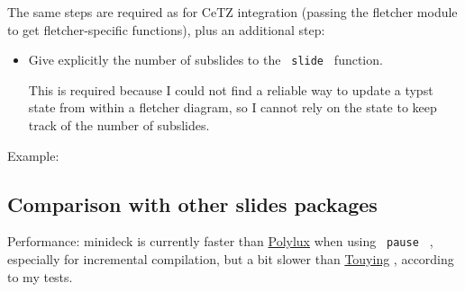 The same steps are required as for CeTZ integration (passing the
fletcher module to get fletcher-specific functions), plus an additional
step:

\begin{itemize}
\item
  Give explicitly the number of subslides to the \texttt{\ slide\ }
  function.

  This is required because I could not find a reliable way to update a
  typst state from within a fletcher diagram, so I cannot rely on the
  state to keep track of the number of subslides.
\end{itemize}

Example:

\begin{Shaded}
\begin{Highlighting}[]

\NormalTok{\#slide(steps: 2)[}



\NormalTok{  )}
  
\NormalTok{]}
\end{Highlighting}
\end{Shaded}

\subsection{Comparison with other slides
packages}\label{comparison-with-other-slides-packages}

Performance: minideck is currently faster than
\href{https://typst.app/universe/package/polylux/}{Polylux} when using
\texttt{\ pause\ } , especially for incremental compilation, but a bit
slower than \href{https://typst.app/universe/package/touying}{Touying} ,
according to my tests.

